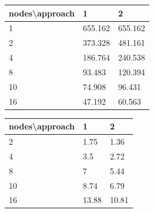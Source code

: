 \documentclass[a4paper]{article}
\begin{document}
\enspace

\begin{minipage}[b]{.40\textwidth}
  \centering
  \begin{tabular}{l|l|l}
  \centering
nodes\textbackslash approach & 1 & 2 \\ \hline
1 & 655.162 & 655.162 \\ \hline
2 & 373.328 & 481.161 \\ \hline
4 & 186.764 & 240.538 \\ \hline
8 & 93.483 & 120.394 \\ \hline
10 & 74.908 & 96.431 \\ \hline
16 & 47.192 & 60.563 \\ 
    \hline
  \end{tabular}
  \label{tab:t_app3}
\end{minipage} \qquad
\begin{minipage}[b]{.40\textwidth}
  \centering
  \begin{tabular}{l|l|l}
nodes\textbackslash approach & 1 & 2 \\ \hline
2 & 1.75 & 1.36 \\ \hline
4 & 3.5 & 2.72 \\ \hline
8 & 7 & 5.44 \\ \hline
10 & 8.74 & 6.79 \\ \hline
16 & 13.88 & 10.81 \\ 
  \hline
  \end{tabular}
  \label{tab:t_app4}
\end{minipage}
\end{document}

